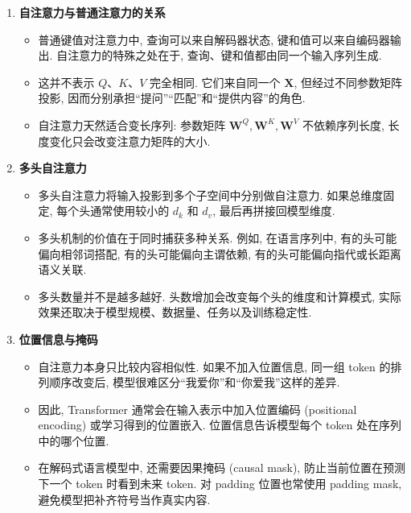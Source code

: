 \documentclass{../nndlcourse}
\begin{document}
\begin{enumerate}
\begin{itemize}
      这里 softmax 对每一行进行归一化, 因而第 $i$ 行表示第 $i$ 个位置作为查询时对所有位置的注意力分布.
      \item 展开到单个位置, 有
      \begin{equation*}
        \boldsymbol{h}_i = \sum_{j=1}^{L}\alpha_{ij}\boldsymbol{v}_j,\qquad
        \alpha_{ij}
        =
        \frac{\exp(\boldsymbol{q}_i^\top\boldsymbol{k}_j/\sqrt{d_k})}
        {\sum_{\ell=1}^{L}\exp(\boldsymbol{q}_i^\top\boldsymbol{k}_{\ell}/\sqrt{d_k})}.
      \end{equation*}
      这说明每个输出位置都是全部值向量的加权和, 权重由该位置的查询和其他位置的键决定.
    \end{itemize}
  \item \textbf{自注意力与普通注意力的关系}
    \begin{itemize}
      \item 普通键值对注意力中, 查询可以来自解码器状态, 键和值可以来自编码器输出. 自注意力的特殊之处在于, 查询、键和值都由同一个输入序列生成.
      \item 这并不表示 $Q$、$K$、$V$ 完全相同. 它们来自同一个 $\boldsymbol{X}$, 但经过不同参数矩阵投影, 因而分别承担“提问”“匹配”和“提供内容”的角色.
      \item 自注意力天然适合变长序列: 参数矩阵 $\boldsymbol{W}^Q,\boldsymbol{W}^K,\boldsymbol{W}^V$ 不依赖序列长度, 长度变化只会改变注意力矩阵的大小.
    \end{itemize}
  \item \textbf{多头自注意力}
    \begin{itemize}
      \item 多头自注意力将输入投影到多个子空间中分别做自注意力. 如果总维度固定, 每个头通常使用较小的 $d_k$ 和 $d_v$, 最后再拼接回模型维度.
      \item 多头机制的价值在于同时捕获多种关系. 例如, 在语言序列中, 有的头可能偏向相邻词搭配, 有的头可能偏向主谓依赖, 有的头可能偏向指代或长距离语义关联.
      \item 多头数量并不是越多越好. 头数增加会改变每个头的维度和计算模式, 实际效果还取决于模型规模、数据量、任务以及训练稳定性.
    \end{itemize}
  \item \textbf{位置信息与掩码}
    \begin{itemize}
      \item 自注意力本身只比较内容相似性. 如果不加入位置信息, 同一组 token 的排列顺序改变后, 模型很难区分“我爱你”和“你爱我”这样的差异.
      \item 因此, Transformer 通常会在输入表示中加入位置编码 (positional encoding) 或学习得到的位置嵌入. 位置信息告诉模型每个 token 处在序列中的哪个位置.
      \item 在解码式语言模型中, 还需要因果掩码 (causal mask), 防止当前位置在预测下一个 token 时看到未来 token. 对 padding 位置也常使用 padding mask, 避免模型把补齐符号当作真实内容.
    \end{itemize}
\end{enumerate}
\end{document}
